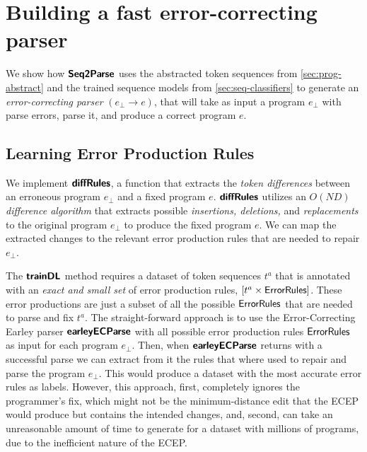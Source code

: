 \section{Building a fast error-correcting parser}
\label{sec:whole-system}

We show how $\bm{\mathsf{Seq2Parse}}$ uses the abstracted token sequences from
\autoref{sec:prog-abstract} and the trained sequence models from
\autoref{sec:seq-classifiers} to generate an \emph{error-correcting parser}
$(e_{\bot} \to e)$, that will take as input a program $e_{\bot}$ with parse
errors, parse it, and produce a correct program $e$.


\subsection{Learning Error Production Rules}
\label{sec:whole-system:error-rules}
We implement $\bm{\mathsf{diffRules}}$, a function that extracts the \emph{token differences}
between an erroneous program $e_{\bot}$ and a fixed program $e$. $\bm{\mathsf{diffRules}}$
utilizes an \emph{$O(ND)$ difference algorithm} \citep{Myers_1986} that extracts
possible \emph{insertions, deletions,} and \emph{replacements} to the original
program $e_{\bot}$ to produce the fixed program $e$. We can map the extracted
changes to the relevant error production rules that are needed to repair
$e_{\bot}$.

The $\bm{\mathsf{trainDL}}$ method requires a dataset of token sequences $t^a$ that is
annotated with an \emph{exact and small set} of error production rules, \ie
$[t^a \times \mathsf{ErrorRules}]$. These error productions are just a subset of
all the possible $\mathsf{ErrorRules}$ that are needed to parse and fix $t^a$. The
straight-forward approach is to use the Error-Correcting Earley parser
$\bm{\mathsf{earleyECParse}}$ with all possible error production rules $\mathsf{ErrorRules}$ as input
for each program $e_{\bot}$. Then, when $\bm{\mathsf{earleyECParse}}$ returns with a successful
parse we can extract from it the rules that where used to repair and parse the
program $e_{\bot}$. This would produce a dataset with the most accurate error
rules as labels. However, this approach, first, completely ignores the
programmer's fix, which might not be the minimum-distance edit that the ECEP
would produce but contains the intended changes, and, second, can take an
unreasonable amount of time to generate for a dataset with millions of programs,
due to the inefficient nature of the ECEP.

